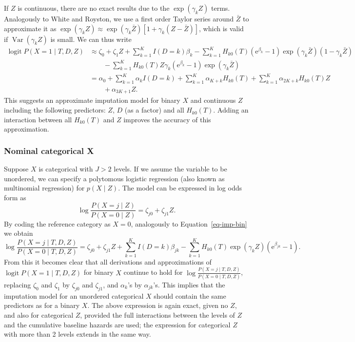 \documentclass[
  letterpaper,
  DIV=11,
  numbers=noendperiod]{scrreprt}
\DeclareMathOperator{\logit}{logit}
\DeclareMathOperator{\Var}{Var}
\begin{document}
If \(Z\) is continuous, there are no exact results due to the
\(\exp(\gamma_k Z)\) terms. Analogously to White and Royston, we use a
first order Taylor series around \(\bar{Z}\) to approximate it as
\(\exp(\gamma_k Z) \approx \exp(\gamma_k \bar{Z}) [ 1 + \gamma_k(Z - \bar{Z}) ]\),
which is valid if \(\Var(\gamma_k Z)\) is
small.\cite{whiteImputingMissingCovariate2009} We can thus write
\begin{align*}
    \logit P(X = 1 \mid T, D, Z) &\approx \zeta_0 + \zeta_1 Z + \sum^K_{k = 1} I(D=k) \beta_k \nonumber - \sum^K_{k = 1} H_{k0}(T)(\mathrm{e}^{\beta_k}  - 1)\exp(\gamma_k \bar{Z})(1 - \gamma_k \bar{Z}) \nonumber \\
    &\qquad - \sum^K_{k = 1} H_{k0}(T) Z \gamma_k (\mathrm{e}^{\beta_k}  - 1)\exp(\gamma_k \bar{Z}) \nonumber \\
    &= \alpha_0  + \sum^K_{k = 1} \alpha_{k} I(D=k) + \sum^K_{k = 1} \alpha_{K + k} H_{k0}(T) + \sum^K_{k = 1} \alpha_{2K + k} H_{k0}(T) Z \nonumber \\
    &\qquad + \alpha_{3K + 1} Z.
\end{align*} This suggests an approximate imputation model for binary
\(X\) and continuous \(Z\) including the following predictors: \(Z\),
\(D\) (as a factor) and all \(H_{k0}(T)\). Adding an interaction between
all \(H_{k0}(T)\) and \(Z\) improves the accuracy of this approximation.

\hypertarget{nominal-categorical-x-1}{%
\subsubsection{Nominal categorical X}\label{nominal-categorical-x-1}}

Suppose \(X\) is categorical with \(J>2\) levels. If we assume the
variable to be unordered, we can specify a polytomous logistic
regression (also known as multinomial regression) for \(p(X \mid Z)\).
The model can be expressed in log odds form as \begin{equation*}
    \log \frac{P(X = j \mid Z)}{P(X = 0\mid Z)}  = \zeta_{j0} + \zeta_{j1} Z.
\end{equation*} By coding the reference category as \(X=0\), analogously
to Equation~\ref{eq-imp-bin} we obtain \begin{equation*}
    \log \frac{P(X = j \mid T,D,Z)}{P(X = 0\mid T,D,Z)} = \zeta_{j0} + \zeta_{j1} Z + \sum^K_{k = 1} I(D=k) \beta_{jk} - \sum^K_{k = 1} H_{k0}(T)\exp(\gamma_k Z)(\mathrm{e}^{\beta_{jk}}  - 1).
\end{equation*} From this it becomes clear that all derivations and
approximations of \(\logit P(X = 1 \mid T, D, Z)\) for binary \(X\)
continue to hold for
\(\log \frac{P(X = j \mid T,D,Z)}{P(X = 0\mid T,D,Z)}\), replacing
\(\zeta_0\) and \(\zeta_1\) by \(\zeta_{j0}\) and \(\zeta_{j1}\), and
\(\alpha_k\)'s by \(\alpha_{jk}\)'s. This implies that the imputation
model for an unordered categorical \(X\) should contain the same
predictors as for a binary \(X\). The above expression is again exact,
given no \(Z\), and also for categorical \(Z\), provided the full
interactions between the levels of \(Z\) and the cumulative baseline
hazards are used; the expression for categorical \(Z\) with more than 2
levels extends in the same way.
\end{document}
